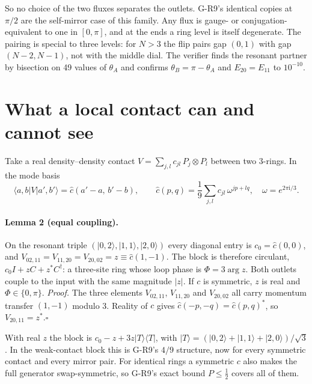 \documentclass[11pt,a4paper]{article}
\newcommand{\ii}{\mathrm i}
\newcommand{\ket}[1]{|#1\rangle}
\newcommand{\bra}[1]{\langle#1|}
\begin{document}
So no choice of the two fluxes separates the outlets. G-R9's identical
copies at $\pi/2$ are the self-mirror case of this family. Any flux is
gauge- or conjugation-equivalent to one in $[0,\pi]$, and at the ends a
ring level is itself degenerate. The pairing is special to three levels:
for $N>3$ the flip pairs gap $(0,1)$ with gap $(N-2,N-1)$, not with the
middle dial. The verifier finds the resonant partner by bisection on 49
values of $\theta_A$ and confirms $\theta_B=\pi-\theta_A$ and
$E_{20}=E_{11}$ to $10^{-10}$.

\section{What a local contact can and cannot see}
Take a real density--density contact
$V=\sum_{j,l}c_{jl}\,P_j\otimes P_l$ between two 3-rings. In the mode basis
\begin{equation}
 \bra{a,b}V\ket{a',b'}=\hat c(a'-a,\,b'-b),\qquad
 \hat c(p,q)=\frac19\sum_{j,l}c_{jl}\,\omega^{jp+lq},\quad \omega=e^{2\pi\ii/3}.
\end{equation}
\paragraph{Lemma 2 (equal coupling).}
On the resonant triple $(\ket{0,2},\ket{1,1},\ket{2,0})$ every diagonal
entry is $c_0=\hat c(0,0)$, and
$V_{02,11}=V_{11,20}=V_{20,02}=z\equiv\hat c(1,-1)$. The block is
therefore circulant, $c_0I+zC+z^*C^\dagger$: a three-site ring whose loop
phase is $\Phi=3\arg z$. Both outlets couple to the input with the same
magnitude $|z|$. If $c$ is symmetric, $z$ is real and $\Phi\in\{0,\pi\}$.
\emph{Proof.} The three elements $V_{02,11}$, $V_{11,20}$ and $V_{20,02}$
all carry momentum transfer $(1,-1)$ modulo 3. Reality of $c$ gives
$\hat c(-p,-q)=\hat c(p,q)^*$, so $V_{20,11}=z^*$.\hfill$\square$

With real $z$ the block is $c_0-z+3z\ket T\bra T$, with
$\ket T=(\ket{0,2}+\ket{1,1}+\ket{2,0})/\sqrt3$. In the weak-contact block this is G-R9's $4/9$
structure, now for every symmetric contact and every mirror pair. For
identical rings a symmetric $c$ also makes the full generator
swap-symmetric, so G-R9's exact bound $P\le\frac12$ covers all of them.
\end{document}
